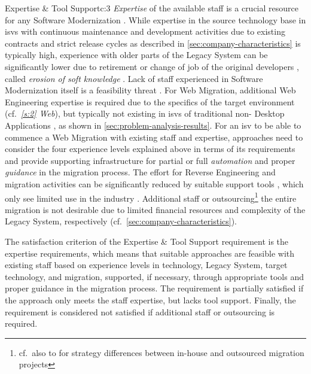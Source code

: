 \begin{thesisstakeholderrequirement}{Expertise \& Tool Support}{c:3}
\emph{Expertise} of the available staff is a crucial resource for any \gls{Software Modernization} \autocite{Khadka2014ProfessionalsModernization,Batlajery2014IndustrialSurveyModernization,Sneed2010SoftwareMigration,Seacord2003ModernizingLS}.
While expertise in the source technology base in \glspl{isv} with continuous maintenance and development activities due to existing contracts and strict release cycles as described in \cref{sec:company-characteristics} is typically high, experience with older parts of the \gls{Legacy System} can be significantly lower due to retirement or change of job of the original developers \autocite{Khadka2016PHD,Batlajery2014IndustrialSurveyModernization,Khadka2014ProfessionalsModernization}, called \emph{erosion of soft knowledge} \autocite{Khadka2014ProfessionalsModernization}.
Lack of staff experienced in \gls{Software Modernization} itself is a feasibility threat \autocite{Sneed2010SoftwareMigration,Seacord2003ModernizingLS}.
For \gls{Web Migration}, additional \gls{Web Engineering} expertise is required due to the specifics of the target environment (cf.~\emph{\cref{s:2} Web}), but typically not existing in \glspl{isv} of traditional non- \glspl{Desktop Application} \autocite{Fowley2017CloudSME}, as shown in \cref{sec:problem-analysis-results}.
For an \gls{isv} to be able to commence a \gls{Web Migration} with existing staff and expertise, approaches need to consider the four experience levels explained above in terms of its requirements and provide supporting infrastructure for partial or full \emph{automation} and proper \emph{guidance} in the migration process.
The effort for \gls{Reverse Engineering} and migration activities can be significantly reduced by suitable support tools \autocite{Lucia2009METAMORPHOS}, which only see limited use in the industry \autocite{Torchiano2008ItalianSurvey}.
Additional staff or outsourcing\footnote{cf.~also to \autocite{Razavian2012} for strategy differences between in-house and outsourced migration projects} the entire migration is not desirable due to limited financial resources and complexity of the \gls{Legacy System}, respectively (cf.~\cref{sec:company-characteristics}).

The satisfaction criterion of the Expertise \& Tool Support requirement is the expertise requirements, which means that suitable approaches are feasible with existing staff based on experience levels in  technology, \gls{Legacy System}, target technology, and migration, supported, if necessary, through appropriate tools and proper guidance in the migration process.
The requirement is partially satisfied if the approach only meets the staff expertise, but lacks tool support.
Finally, the requirement is considered not satisfied if additional staff or outsourcing is required.
\end{thesisstakeholderrequirement}

